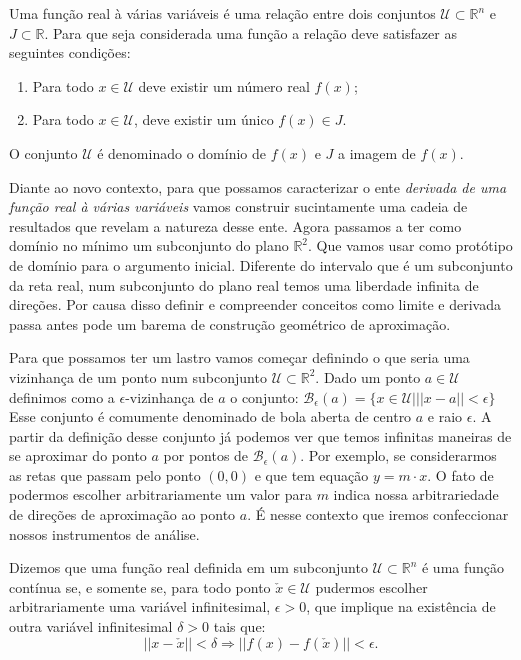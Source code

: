 \begin{definition}
  Uma função real à várias variáveis é uma relação entre dois conjuntos $\mathcal{U} \subset \mathbb{R}^n$ e $J \subset \mathbb{R}$. Para que seja considerada uma função a relação deve satisfazer as seguintes condições:				
  \begin{enumerate}
  \item Para todo $x \in \mathcal{U}$ deve existir um número real $f(x)$;
  \item Para todo $x \in \mathcal{U}$, deve existir um único $f(x) \in J$.
  \end{enumerate}
  O conjunto $\mathcal{U}$ é denominado o domínio de $f(x)$ e $J$ a imagem de $f(x)$.
\end{definition}


\par Diante ao novo contexto, para que possamos caracterizar o ente \textit{derivada de uma função real à várias variáveis} vamos construir sucintamente uma cadeia de resultados que revelam a natureza desse ente. Agora passamos a ter como domínio no mínimo um subconjunto do plano $\mathbb{R}^2$. Que vamos usar como protótipo de domínio para o argumento inicial. Diferente do intervalo que é um subconjunto da reta real, num subconjunto do plano real temos uma liberdade infinita de direções. Por causa disso definir e compreender conceitos como limite e derivada passa antes pode um barema de construção geométrico de aproximação. 

\par Para que possamos ter um lastro vamos começar definindo o que seria uma vizinhança de um ponto num subconjunto $\mathcal{U} \subset \mathbb{R}^2$. Dado um ponto $a \in \mathcal{U}$ definimos como a $\epsilon$-vizinhança de $a$ o conjunto: $\mathcal{B}_{\epsilon}(a) = \{x \in \mathcal{U} | ||x - a|| < \epsilon\}$ Esse conjunto é comumente denominado de bola aberta de centro $a$ e raio $\epsilon$. A partir da definição desse conjunto já podemos ver que temos infinitas maneiras de se aproximar do ponto $a$ por pontos de $\mathcal{B}_{\epsilon}(a)$. Por exemplo, se considerarmos as retas que passam pelo ponto $(0,0)$ e que tem equação $y = m \cdot x$. O fato de podermos escolher arbitrariamente um valor para $m$ indica nossa arbitrariedade de direções de aproximação ao ponto $a$. É nesse contexto que iremos confeccionar nossos instrumentos de análise.

\begin{definition}
  Dizemos que uma função real definida em um subconjunto $\mathcal{U} \subset \mathbb{R}^n$ é uma função contínua se, e somente se, para todo ponto $\check{x} \in \mathcal{U}$ pudermos escolher arbitrariamente uma variável infinitesimal, $\epsilon > 0$, que implique na existência de outra variável infinitesimal $\delta>0$ tais que:
  $$||x - \check{x}|| < \delta \Rightarrow ||f(x) - f(\check{x})|| < \epsilon.$$ 
\end{definition}

